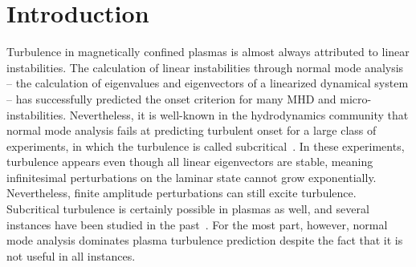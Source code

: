 \documentclass[letter,scriptaddress,twocolumn, prl,showkeys]{revtex4}
\begin{document}
\title{}

\author{B. Friedman}

\author{T.A. Carter}




\begin{abstract}

\end{abstract}

\maketitle

\section{Introduction}

Turbulence in magnetically confined plasmas is almost always attributed to linear instabilities. The calculation of linear instabilities through normal mode analysis
-- the calculation of eigenvalues and eigenvectors of a linearized dynamical system -- has successfully predicted the onset criterion for many MHD and micro-instabilities.
Nevertheless, it is well-known in the hydrodynamics community that normal mode analysis fails at predicting turbulent onset for a large class of experiments, in which the
turbulence is called subcritical~\cite{drazin1981}. 
In these experiments, turbulence appears even though all linear eigenvectors are stable, meaning infinitesimal perturbations on the laminar state cannot grow exponentially. 
Nevertheless, finite amplitude perturbations can still excite turbulence.
Subcritical turbulence is certainly possible in plasmas as well, and several instances have been studied in the 
past~\cite{waltz1985,scott1990,nordman1993,biskamp1995,drake1995,itoh1996,camargo1998,krommes1999,camporeale2009,schekochihin2012,highcock2012}. 
For the most part, however, normal mode analysis dominates plasma turbulence prediction despite the fact that it is not useful in all instances.
\end{document}
